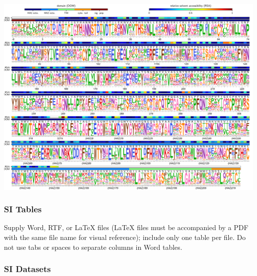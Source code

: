 \documentclass[9pt,twocolumn,twoside]{pnas-new}
\begin{document}
\begin{suppfigure}
\centerline{\includegraphics[width=\textwidth]{figs/S03_WSNprefs_logoplot/WSN-rescaled_prefs.pdf}}
\caption{\label{suppfig:WSNprefs_logoplot}
{\bf The site-specific amino-acid preferences of the WSN/1933 H1 HA.} 
}
\end{suppfigure}

\subsubsection*{SI Tables}

Supply Word, RTF, or LaTeX files (LaTeX files must be accompanied by a PDF with the same file name for visual reference); include only one table per file. Do not use tabs or spaces to separate columns in Word tables.

\subsubsection*{SI Datasets} 

\begin{suppdata}
\caption{\label{suppdata:PerthHA}
Genbank file giving the full sequence of the bidirectional reverse-genetics plasmid pHW-Perth2009-HA-G78D-T212I, which encodes the wildtype HA sequence used in this study.
}
\end{suppdata}
\end{document}
